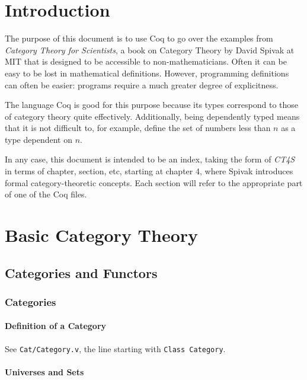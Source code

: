 \documentclass[12pt,twocolumn,oneside]{book}
\begin{document}
\setcounter{secnumdepth}{5}

\newcommand{\see}[2]{
        See \texttt{#1}, the line starting with \texttt{#2}.
    }
\newcommand{\reference}[4]{
        #1{#2} \see{#3}{#4}
    }

\chapter*{Introduction}

The purpose of this document is to use Coq to go over the examples from
\emph{Category Theory for Scientists}, a book on Category Theory by David
Spivak at MIT that is designed to be accessible to non-mathematicians. Often it
can be easy to be lost in mathematical definitions. However, programming definitions
can often be easier: programs require a much greater degree of explicitness.

The language Coq is good for this purpose because its types correspond to those
of category theory quite effectively. Additionally, being dependently typed means
that it is not difficult to, for example, define the set of numbers less than $n$
as a type dependent on $n$.

In any case, this document is intended to be an index, taking the form of \emph{CT4S}
in terms of chapter, section, etc, starting at chapter 4, where Spivak introduces
formal category-theoretic concepts. Each section will refer to the appropriate
part of one of the Coq files.

\setcounter{chapter}{3}
\chapter{Basic Category Theory}


\section{Categories and Functors}

\subsection{Categories}

\reference{\subsubsection}{Definition of a Category}{Cat/Category.v}{Class Category}

\subsubsection{Universes and Sets}
\end{document}
